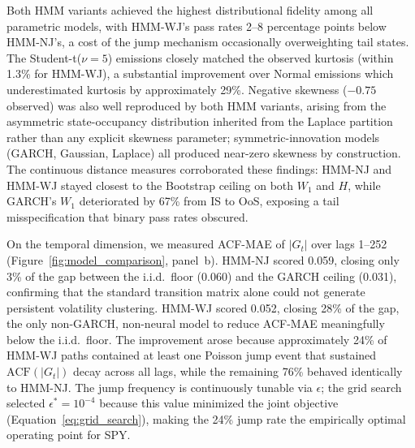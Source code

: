 Both HMM variants achieved the highest distributional fidelity among all parametric models, with HMM-WJ's pass rates 2--8 percentage points below HMM-NJ's, a cost of the jump mechanism occasionally overweighting tail states. The Student-t($\nu=5$) emissions closely matched the observed kurtosis (within 1.3\% for HMM-WJ), a substantial improvement over Normal emissions which underestimated kurtosis by approximately 29\%. Negative skewness ($-0.75$ observed) was also well reproduced by both HMM variants, arising from the asymmetric state-occupancy distribution inherited from the Laplace partition rather than any explicit skewness parameter; symmetric-innovation models (GARCH, Gaussian, Laplace) all produced near-zero skewness by construction. The continuous distance measures corroborated these findings: HMM-NJ and HMM-WJ stayed closest to the Bootstrap ceiling on both $W_1$ and $H$, while GARCH's $W_1$ deteriorated by 67\% from IS to OoS, exposing a tail misspecification that binary pass rates obscured.

On the temporal dimension, we measured ACF-MAE of $|G_t|$ over lags 1--252 (Figure~\ref{fig:model_comparison}, panel~b). HMM-NJ scored 0.059, closing only 3\% of the gap between the i.i.d.\ floor (0.060) and the GARCH ceiling (0.031), confirming that the standard transition matrix alone could not generate persistent volatility clustering. HMM-WJ scored 0.052, closing 28\% of the gap, the only non-GARCH, non-neural model to reduce ACF-MAE meaningfully below the i.i.d.\ floor. The improvement arose because approximately 24\% of HMM-WJ paths contained at least one Poisson jump event that sustained $\text{ACF}(|G_t|)$ decay across all lags, while the remaining 76\% behaved identically to HMM-NJ. The jump frequency is continuously tunable via $\epsilon$; the grid search selected $\epsilon^{*}=10^{-4}$ because this value minimized the joint objective (Equation~\ref{eq:grid_search}), making the 24\% jump rate the empirically optimal operating point for SPY.


